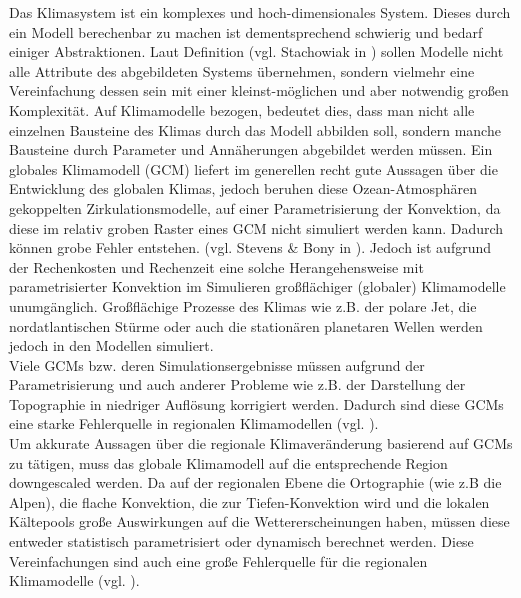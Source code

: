 Das Klimasystem ist ein komplexes und hoch-dimensionales System. Dieses durch ein Modell berechenbar zu machen ist dementsprechend schwierig und bedarf einiger Abstraktionen. Laut Definition (vgl. Stachowiak in \cite{stachowiak}) sollen Modelle nicht alle Attribute des abgebildeten Systems übernehmen, sondern vielmehr eine Vereinfachung dessen sein mit einer kleinst-möglichen und aber notwendig großen Komplexität. Auf Klimamodelle bezogen, bedeutet dies, dass man nicht alle einzelnen Bausteine des Klimas durch das Modell abbilden soll, sondern manche Bausteine durch Parameter und Annäherungen abgebildet werden müssen. Ein globales Klimamodell (GCM) liefert im generellen recht gute Aussagen über die Entwicklung des globalen Klimas, jedoch beruhen diese Ozean-Atmosphären gekoppelten Zirkulationsmodelle, auf einer Parametrisierung der Konvektion, da diese im relativ groben Raster eines GCM nicht simuliert werden kann. Dadurch können grobe Fehler entstehen. (vgl. Stevens \& Bony in \cite{stevensbony}). Jedoch ist aufgrund der Rechenkosten und Rechenzeit eine solche Herangehensweise mit parametrisierter Konvektion im Simulieren großflächiger (globaler) Klimamodelle  unumgänglich. Großflächige Prozesse des Klimas wie z.B. der polare Jet, die nordatlantischen Stürme oder auch die stationären planetaren Wellen werden jedoch in den Modellen simuliert.\\
Viele GCMs bzw. deren Simulationsergebnisse müssen aufgrund der Parametrisierung und auch anderer Probleme wie z.B. der Darstellung der Topographie in niedriger Auflösung korrigiert werden. Dadurch sind diese GCMs eine starke Fehlerquelle in regionalen Klimamodellen (vgl. \cite{woollings_2013}).\\
Um akkurate Aussagen über die regionale Klimaveränderung  basierend auf GCMs zu tätigen, muss das globale Klimamodell auf die entsprechende Region downgescaled werden. Da auf der regionalen Ebene die Ortographie (wie z.B die Alpen), die flache Konvektion, die zur Tiefen-Konvektion wird und die lokalen Kältepools große Auswirkungen auf die Wettererscheinungen haben, müssen diese entweder statistisch parametrisiert oder dynamisch berechnet werden. Diese Vereinfachungen sind auch eine große Fehlerquelle für die regionalen Klimamodelle (vgl. \cite{maraun_2010,casanueva_2013}).\\
